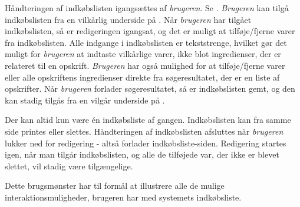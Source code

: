 {Håndteringen af indkøbslisten igangsættes af \textit{brugeren}. Se . \textit{Brugeren} kan tilgå indkøbslisten fra en vilkårlig underside på \Foodl. Når \textit{brugeren} har tilgået indkøbslisten, så er redigeringen igangsat, og det er muligt at tilføje/fjerne varer fra indkøbslisten. Alle indgange i indkøbslisten er tekststrenge, hvilket gør det muligt for \textit{brugeren} at indtaste vilkårlige varer, ikke blot ingredienser, der er relateret til \fx en opskrift. \textit{Brugeren} har også mulighed for at tilføje/fjerne varer eller alle opskriftens ingredienser direkte fra søgeresultatet, der er en liste af opskrifter. Når \textit{brugeren} forlader søgeresultatet, så er indkøbslisten gemt, og den kan stadig tilgås fra en vilgår underside på \Foodl. 

Der kan altid kun være én indkøbsliste af gangen. Indkøbslisten kan fra samme side printes eller slettes. Håndteringen af indkøbslisten afsluttes når \textit{brugeren} lukker ned for redigering - altså forlader indkøbsliste-siden. Redigering startes igen, når man tilgår indkøbslisten, og alle de tilføjede var, der ikke er blevet slettet, vil stadig være tilgængelige. }
{}
{}
{Dette brugsmønster har til formål at illustrere alle de mulige interaktionsmuligheder, brugeren har med systemets indkøbsliste.}